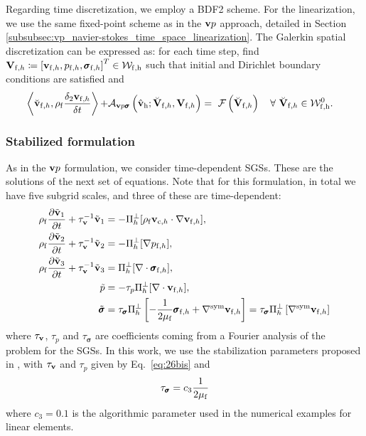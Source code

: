 \documentclass[11pt,english]{article}
\def\alevelocityh{\vb{v}_{\mathrm{c},h}}
\def\densfluid{\rho_{\rm{f}}}                %
\def\viscfluid{\mu_{\rm{f}}}                 %
\def\testfluidh{\breve{\vb{V}}_{{\rm f} ,h}}
\def\testvfluidh{\breve{\vb{v}}_{{\rm f} ,h}}
\def\unknofluidh{\vb{V}_{\mathrm{f},h}}
\def\vfluidh{\vb{v}_{{\mathrm{f}},h}}
\def\pfluidh{p_{{\mathrm{f}},h}}
\def\vhath{\hat{\vb{v}}_{\rm{h}}}
\def\sigmafluidh{\pmb{\sigma}_{{\rm{f}},h}}
\def\unknofluidspaceh{\mathcal{W}_{\rm{f},\rm{h}}}        %
\def\testfluidspaceh{\mathcal{W}_{\rm{f},\rm{h}}^{0}}     %
\def\vpsigma{\vb{v}p\pmb{\sigma}}
\def\vp{\vb{v}p}
\begin{document}
Regarding time discretization, we employ a BDF2 scheme. For the linearization, we use the same fixed-point scheme as in the $\vp$ approach, detailed in Section \ref{subsubsec:vp_navier-stokes_time_space_linearization}.
The Galerkin spatial discretization can be expressed as:  for each time step, find $\unknofluidh \coloneqq \left [ \vfluidh, \pfluidh, \sigmafluidh \right ]^T \in  \unknofluidspaceh $ such that initial and Dirichlet boundary conditions are satisfied and
\begin{align*}
\begin{split}
  \left \langle \testvfluidh, \densfluid\frac{\delta_2 \vfluidh}{\delta t} \right \rangle +&  \mathcal{A}_{\vpsigma} \left (\vhath;  \testfluidh, \unknofluidh  \right) 
   =  ~\mathcal{F} \left ( \testfluidh  \right) \quad \forall \ \testfluidh \in \testfluidspaceh.
\end{split}
\end{align*}


\subsubsection{Stabilized formulation}

As in the $\vp$ formulation, we consider time-dependent SGSs. These are the solutions of the next set of equations. Note that for this formulation, in total we have five subgrid scales, and three of these are time-dependent:
\begin{align*}
    \densfluid\frac{\partial\tilde{\vb{v}}_{1}}{\partial t}+\tau_{\vb{v}}^{-1}\tilde{\vb{v}}_{1}  &=-\Pi_{h}^{\bot}[\densfluid\alevelocityh\cdot\nabla\vfluidh],\\
    \densfluid\frac{\partial\tilde{\vb{v}}_{2}}{\partial t}+\tau_{\vb{v}}^{-1}\tilde{\vb{v}}_{2}  &=-\Pi_{h}^{\bot}[\nabla \pfluidh],\\
    \densfluid\frac{\partial\tilde{\vb{v}}_{3}}{\partial t}+\tau_{\vb{v}}^{-1}\tilde{\vb{v}}_{3}  &=\Pi_{h}^{\bot}[\nabla \cdot \sigmafluidh],\\
    \tilde{p} &=-\tau_p\Pi_{h}^{\bot}[\nabla\cdot\vfluidh],\\
    \tilde{\pmb{\sigma}} &=  \tau_{\pmb{\sigma}} \Pi_{h}^{\bot}\left[-\dfrac{1}{2\viscfluid}\sigmafluidh +\nabla^{\rm sym}\vfluidh\right]
    =  \tau_{\pmb{\sigma}} \Pi_{h}^{\bot}\left[\nabla^{\rm sym}\vfluidh\right]
\end{align*}
where $\tau_{\vb{v}}$, $\tau_p$ and $\tau_{\pmb{\sigma}}$ are coefficients coming from a Fourier analysis of the problem for the SGSs. In this work, we use the stabilization parameters proposed in \cite{ErnestoRamon2014}, with $\tau_{\vb{v}}$ and $ \tau_p $ given by Eq.~\eqref{eq:26bis} and 
\begin{equation*}
      \tau_{\pmb{\sigma}}=c_3\dfrac{1}{2\viscfluid}
\end{equation*}
where  $c_3=0.1$ is the algorithmic parameter used in the numerical examples for linear elements. 
\end{document}
